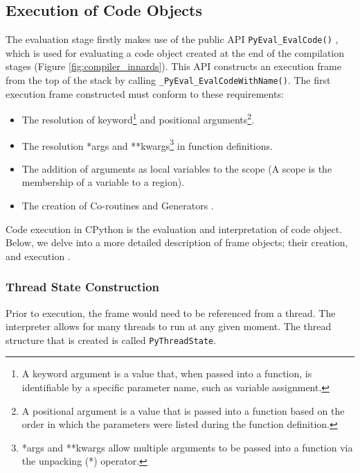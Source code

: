 {		\subsection{Execution of Code Objects}
		The evaluation stage firstly makes use of the public API \lstinline|PyEval_EvalCode()| \cite[lines 716--724]{ceval2022github}, which is used for evaluating a code object created 
		at the end of the compilation stages (Figure \ref{fig:compiler_innards}). This API constructs an execution frame from the top of the stack by calling \lstinline|_PyEval_EvalCodeWithName()|.
		The first execution frame constructed must conform to these requirements:
		\begin{itemize}
			\item The resolution of keyword\footnote{A keyword argument is a value that, when passed into a function, is identifiable by a specific parameter name, such as variable assignment.} 
			and positional arguments\footnote{A positional argument is a value that is passed into a function based on the order in which the parameters were listed during the function definition.}.
			\item The resolution *args and **kwargs\footnote{\label{footnote:kwargs_args}*args and **kwargs allow multiple arguments to be passed into a function via the unpacking (*) operator.} 
			in function definitions.
			\item The addition of arguments as local variables to the scope (A scope is the membership of a variable to a region).
			\item The creation of Co-routines and Generators \cite[pp.2--3]{tismer2000continuations}.
		\end{itemize} 
		Code execution in CPython is the evaluation and interpretation of code object. Below, we delve into a more detailed description of frame objects; their creation, and execution \cite[]{real2022python}.
		
			\subsubsection*{Thread State Construction}
			\par Prior to execution, the frame would need to be referenced from a thread. The interpreter allows for many threads to run at any given moment. The thread structure that is created is called 
			\lstinline|PyThreadState|.
			
}
